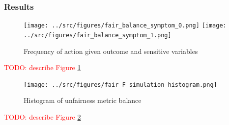\subsubsection*{Results}



\begin{figure}
    \texttt{[image: ../src/figures/fair\_balance\_symptom\_0.png]} 
    \texttt{[image: ../src/figures/fair\_balance\_symptom\_1.png]} 
    \caption{Frequency of action given outcome and sensitive variables}
    \label{Fair_comp}
\end{figure}

\textcolor{red}{TODO: describe Figure \ref{Fair_comp}}

\begin{figure}
    \texttt{[image: ../src/figures/fair\_F\_simulation\_histogram.png]} 
    \caption{Histogram of unfairness metric balance}
    \label{F_histogram}
\end{figure}

\textcolor{red}{TODO: describe Figure \ref{F_histogram}}


\newpage

